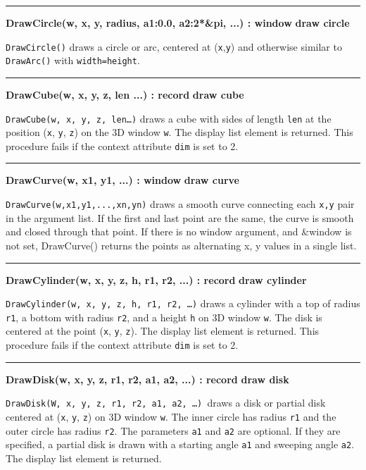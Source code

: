 \bigskip\hrule\vspace{0.1cm}
\noindent
{\bf DrawCircle(w, x, y, radius, a1:0.0, a2:2*\&pi, ...) : window } \hfill {\bf draw circle}

\noindent
\texttt{DrawCircle()} draws a circle or arc, centered at
(\texttt{x},\texttt{y}) and otherwise similar to \texttt{DrawArc()}
with \texttt{width=height}.

\bigskip\hrule\vspace{0.1cm}
\noindent
{\bf DrawCube(w, x, y, z, len ...) : record } \hfill {\bf draw cube}

\noindent
\texttt{DrawCube(w, x, y, z, len{\dots})} draws a cube with sides of
length \texttt{len} at the position (\texttt{x}, \texttt{y},
\texttt{z}) on the 3D window \texttt{w}. The display list element is
returned. This procedure fails if the context attribute \texttt{dim} is
set to 2. 

\bigskip\hrule\vspace{0.1cm}
\noindent
{\bf DrawCurve(w, x1, y1, ...) : window } \hfill {\bf draw curve}

\noindent
\texttt{DrawCurve(w,x1,y1,...,xn,yn)} draws a smooth curve connecting
each \texttt{x,y} pair in the argument list. If the first and last
point are the same, the curve is smooth and closed through that point.
If there is no window argument, and \&window is not set, DrawCurve()
returns the points as alternating x, y values in a single list.

\bigskip\hrule\vspace{0.1cm}
\noindent
{\bf DrawCylinder(w, x, y, z, h, r1, r2, ...) : record } \hfill {\bf draw cylinder}

\noindent
\texttt{DrawCylinder(w, x, y, z, h, r1, r2, {\dots})} draws a cylinder
with a top of radius \texttt{r1}, a bottom with radius \texttt{r2}, and
a height \texttt{h} on 3D window \texttt{w}. The disk is centered at
the point (\texttt{x}, \texttt{y}, \texttt{z}). The display list
element is returned. This procedure fails if the context attribute
\texttt{dim} is set to 2.

\bigskip\hrule\vspace{0.1cm}
\noindent
{\bf DrawDisk(w, x, y, z, r1, r2, a1, a2, ...) : record } \hfill {\bf draw disk}

\noindent
\texttt{DrawDisk(W, x, y, z, r1, r2, a1, a2, {\dots})}\texttt{ }draws a
disk or partial disk centered at (\texttt{x}, \texttt{y}, \texttt{z})
on 3D window \texttt{w}. The inner circle has radius \texttt{r1} and
the outer circle has radius \texttt{r2}. The parameters \texttt{a1} and
\texttt{a2} are optional. If they are specified, a partial disk is
drawn with a starting angle \texttt{a1} and sweeping angle \texttt{a2}.
The display list element is returned.

